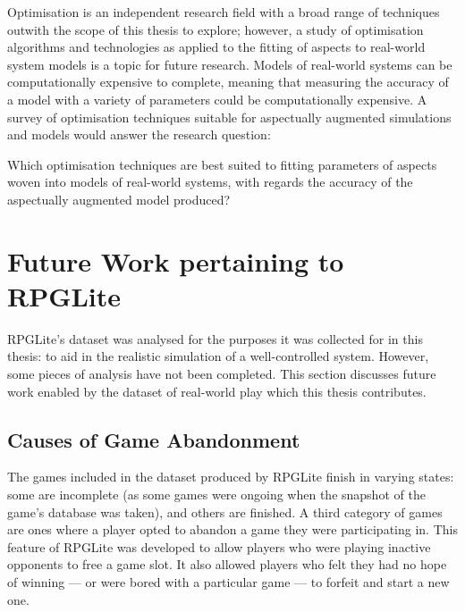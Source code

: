 Optimisation is an independent research field with a broad range
of techniques outwith the scope of this thesis to explore; however, a study of
optimisation algorithms and technologies as applied to the fitting of aspects to
real-world system models is a topic for future research. Models of real-world
systems can be computationally expensive to complete, meaning that measuring the
accuracy of a model with a variety of parameters could be computationally
expensive. A survey of optimisation techniques suitable for aspectually
augmented simulations and models would answer the research question:

\begin{researchquestion}
    Which optimisation techniques are best suited to fitting parameters of
    aspects woven into models of real-world systems, with regards the
    accuracy of the aspectually augmented model produced?
\end{researchquestion}



\section{Future Work pertaining to RPGLite}\label{sec:future_work_rpglite}
RPGLite's dataset was analysed for the purposes it was collected for in this
thesis: to aid in the realistic simulation of a well-controlled \sociotechnical
system. However, some pieces of analysis have not been completed. This section
discusses future work enabled by the dataset of real-world play which this
thesis contributes.

\subsection{Causes of Game Abandonment}\label{future_work_rpglite_abandonment_reasons}

The games included in the dataset produced by RPGLite finish in varying states:
some are incomplete (as some games were ongoing when the snapshot of the game's
database was taken), and others are finished. A third category of games are ones
where a player opted to abandon a game they were participating in. This feature
of RPGLite was developed to allow players who were playing inactive opponents to
free a game slot. It also allowed players who felt they had no hope of winning ---
or were bored with a particular game --- to forfeit and start a new one.

